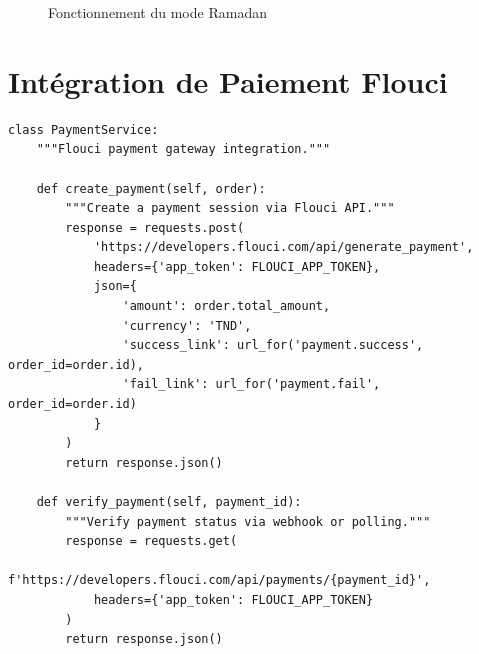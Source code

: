 \documentclass[12pt,a4paper]{report}
\begin{document}
\begin{figure}[H]
    \centering
    \caption{Fonctionnement du mode Ramadan}
    \label{fig:ramadan}
\end{figure}

\section{Intégration de Paiement Flouci}

\begin{lstlisting}[caption={Service de Paiement -- \texttt{app/services/payment\_service.py}}]
class PaymentService:
    """Flouci payment gateway integration."""
    
    def create_payment(self, order):
        """Create a payment session via Flouci API."""
        response = requests.post(
            'https://developers.flouci.com/api/generate_payment',
            headers={'app_token': FLOUCI_APP_TOKEN},
            json={
                'amount': order.total_amount,
                'currency': 'TND',
                'success_link': url_for('payment.success', order_id=order.id),
                'fail_link': url_for('payment.fail', order_id=order.id)
            }
        )
        return response.json()
    
    def verify_payment(self, payment_id):
        """Verify payment status via webhook or polling."""
        response = requests.get(
            f'https://developers.flouci.com/api/payments/{payment_id}',
            headers={'app_token': FLOUCI_APP_TOKEN}
        )
        return response.json()
\end{lstlisting}
\end{document}
